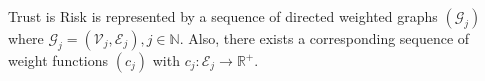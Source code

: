{}
\begin{definition}[Graph]
  Trust is Risk is represented by a sequence of directed weighted graphs $\left(\mathcal{G}_j\right)$ where $\mathcal{G}_j
  = \left(\mathcal{V}_j, \mathcal{E}_j\right), j \in \mathbb{N}$.
  Also, there exists a corresponding sequence of weight functions $\left(c_j\right)$ with $c_j :
  \mathcal{E}_j \rightarrow \mathbb{R}^{+}$.
\end{definition}
